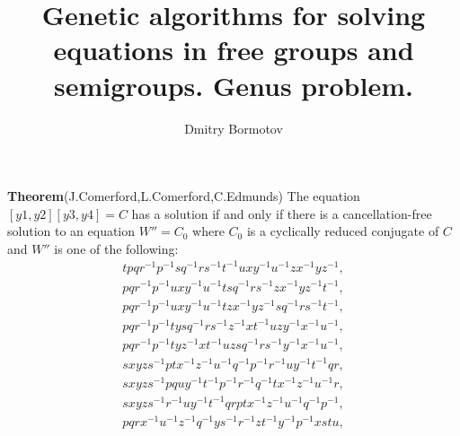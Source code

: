 \documentclass{slides}
\title{Genetic algorithms for solving
equations in free groups and semigroups.  Genus problem.}
\author{Dmitry Bormotov} \date{}
\begin{document}
\pagestyle{empty}



{\bf Theorem}(J.Comerford,L.Comerford,C.Edmunds) 
The equation $[y1,y2][y3,y4] = C$ has a solution if and
only if there is a cancellation-free solution to an equation $W'' =
C_0$ where $C_0$ is a cyclically reduced conjugate of $C$ and $W''$ is
one of the following:
\vspace{3mm}
\begin{eqnarray}
t p q r^{-1} p^{-1} s q^{-1} r s^{-1} t^{-1} u x y^{-1} u^{-1} z x^{-1} 
y z^{-1}, \\
p q r^{-1} p^{-1} u x y^{-1} u^{-1} t s q^{-1} r s^{-1} z x^{-1} y z^{-1} t^{-1},\\
p q r^{-1} p^{-1} u x y^{-1} u^{-1} t z x^{-1} y z^{-1} s q^{-1} r s^{-1} t^{-1},\\
p q r^{-1} p^{-1} t y s q^{-1} r s^{-1} z^{-1} x t^{-1} u z y^{-1} x^{-1} u^{-1},\\
p q r^{-1} p^{-1} t y z^{-1} x t^{-1} u z s q^{-1} r s^{-1} y^{-1} x^{-1} u^{-1},\\
s x y z s^{-1} p t x^{-1} z^{-1} u^{-1} q^{-1} p^{-1} r^{-1} u y^{-1} t^{-1} q r,\\
s x y z s^{-1} p q u y^{-1} t^{-1} p^{-1} r^{-1} q^{-1} t x^{-1} z^{-1} u^{-1} r,\\
s x y z s^{-1} r^{-1} u y^{-1} t^{-1} q r p t x^{-1} z^{-1} u^{-1} q^{-1} p^{-1},\\
p q r x^{-1} u^{-1} z^{-1} q^{-1} y s^{-1} r^{-1} z t^{-1} y^{-1} p^{-1} x s t u, 
\end{eqnarray}
\end{document}
